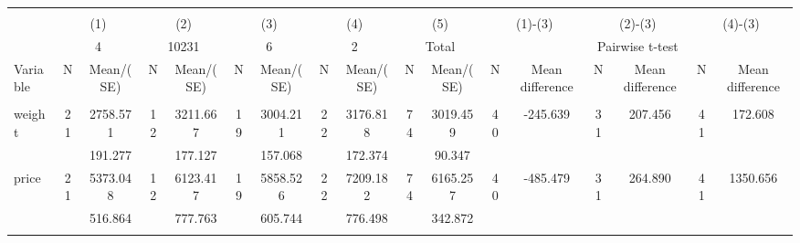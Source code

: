 
\begin{tabular}{@{\extracolsep{5pt}}lcccccccccccccccc}
\\[-1.8ex]\hline \hline \\[-1.8ex]
 & \multicolumn{2}{c}{(1)}  & \multicolumn{2}{c}{(2)}  & \multicolumn{2}{c}{(3)}  & \multicolumn{2}{c}{(4)}  & \multicolumn{2}{c}{(5)}  & \multicolumn{2}{c}{(1)-(3)} & \multicolumn{2}{c}{(2)-(3)} & \multicolumn{2}{c}{(4)-(3)} \\
 & \multicolumn{2}{c}{4}  & \multicolumn{2}{c}{10231}  & \multicolumn{2}{c}{6}  & \multicolumn{2}{c}{2}  & \multicolumn{2}{c}{Total}  & \multicolumn{6}{c}{Pairwise t-test}  \\
Variable & N & Mean/(SE) & N & Mean/(SE) & N & Mean/(SE) & N & Mean/(SE) & N & Mean/(SE) & N & Mean difference & N & Mean difference & N & Mean difference \\ \hline \\[-1.8ex] 
weight   & 21    &  2758.571    & 12    &  3211.667    & 19    &  3004.211    & 22    &  3176.818    & 74    &  3019.459    & 40    &  -245.639    & 31    &   207.456    & 41    &   172.608   \\
 &   &   191.277  &   &   177.127  &   &   157.068  &   &   172.374  &   &    90.347  &   &  &   &  &   &   \\
price   & 21    &  5373.048    & 12    &  6123.417    & 19    &  5858.526    & 22    &  7209.182    & 74    &  6165.257    & 40    &  -485.479    & 31    &   264.890    & 41    &  1350.656   \\
 &   &   516.864  &   &   777.763  &   &   605.744  &   &   776.498  &   &   342.872  &   &  &   &  &   &   \\
\hline \\[-1.8ex]

\end{tabular}
